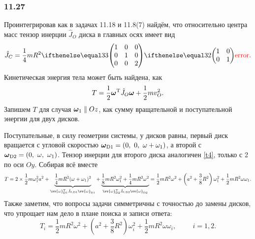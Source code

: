 \subsubsection*{11.27}

Проинтегрировав как в задачах 11.18 и 11.8(7) найдём, что относительно центра масс тензор инерции $\hat{J}_O$ диска в главных осях имеет вид
\begin{equation}
\label{t4}
    \hat{J}_C = \frac{1}{4} mR^2 \dmat{3}{1}{1}{2}.
\end{equation}
Кинетическая энергия тела может быть найдена, как
\begin{equation*}
    T = \frac{1}{2} \mbox{\boldmath $\omega$}^{\text{T}} \hat{J}_O \mbox{\boldmath $\omega$} + \frac{1}{2} m v_O^2.
\end{equation*}
Запишем $T$ для случая $\mbox{\boldmath $\omega$}_1 \parallel Oz$, как сумму вращательной и поступательной энергии для двух дисков. 

Поступательные, в силу геометрии системы, у дисков равны, первый диск вращается с угловой скоростью $\vc{\omega}_{\text{D1}}=(0,\ 0,\ \omega+\omega_1)$, а второй с $\vc{\omega}_{\text{D2}}=(0,\ \omega,\ \omega_1)$. Тензор инерции для второго диска аналогичен \eqref{t4}, только с 2 по оси $Oy$. Собирая всё вместе
\begin{equation*}
    T = 2 \times \frac{1}{2} m \omega_1^2 a^2 + 
    \underbrace{
        \frac{1}{4} mR^2 (\omega + \omega_1)^2
    }_{
    \vv{\omega}_{\text{D1}}\T \hat{J}_{0, \text{D1}} \vv{\omega}_{\text{D1}}
    }
     + 
     \underbrace{
     \frac{1}{8} mR^2 \omega_1^2 + \frac{1}{4} mR^2 \omega^2
     }_{
    \vv{\omega}_{\text{D2}}\T \hat{J}_{0, \text{D2}} \vv{\omega}_{\text{D2}}
     } =
     \frac{1}{2} m R^2 \omega^2 + \left(a^2 + \frac{3}{8} R^2\right) \omega_1^2 + \frac{1}{2} m R^2 \omega \omega_1.
\end{equation*}
Также заметим, что вопросы задачи симметричны с точностью до замены дисков, что упрощает нам дело в плане поиска и записи ответа:
\begin{equation}
    T_i = \frac{1}{2} m R^2 \omega^2 + \left(a^2 + \frac{3}{8} R^2\right) \omega_i^2 + \frac{1}{2} m R^2 \omega \omega_i,
    \hspace{1cm} i = 1, 2.
\end{equation}


